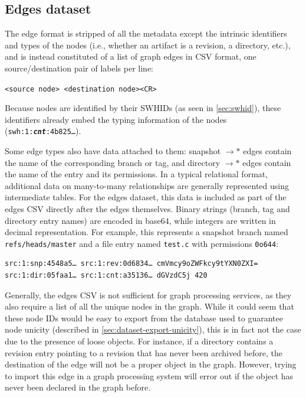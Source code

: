 \subsection{Edges dataset}
\label{sec:edges-format}
The edge format is stripped of all the metadata except the intrinsic
identifiers and types of the nodes (i.e., whether an artifact is a revision, a
directory, etc.), and is instead constituted of a list of graph edges in CSV
format, one source/destination pair of labels per line:

\texttt{<source node> <destination node><CR>}

Because nodes are identified by their \glspl{SWHID} (as seen in
\cref{sec:swhid}), these identifiers already embed the typing
information of the nodes (\texttt{swh:1:\emph{\textbf{cnt}}:4b825…}).

Some edge types also have data attached to them: snapshot $\rightarrow\ast$
edges contain the name of the corresponding branch or tag, and
directory $\rightarrow\ast$ edges contain the name of the entry and its
permissions.
In a typical relational format, additional data on many-to-many relationships
are generally represented using intermediate tables. For the edges dataset,
this data is included as part of the edges CSV directly after the edges
themselves. Binary strings (branch, tag and directory entry names) are encoded
in base64, while integers are written in decimal representation. For example,
this represents a snapshot branch named \texttt{refs/heads/master} and a file
entry named \texttt{test.c} with permissions \texttt{0o644}:

\begin{verbatim}
src:1:snp:4548a5… src:1:rev:0d6834… cmVmcy9oZWFkcy9tYXN0ZXI=
src:1:dir:05faa1… src:1:cnt:a35136… dGVzdC5j 420
\end{verbatim}

Generally, the edges CSV is not sufficient for graph processing services, as
they also require a list of all the unique nodes in the graph. While it could
seem that these node IDs would be easy to export from the database used to
guarantee node unicity (described in \cref{sec:dataset-export-unicity}),
this is in fact not the case due to the presence of loose objects. For
instance, if a directory contains a revision entry pointing to a revision that
has never been archived before, the destination of the edge will not be a
proper object in the graph. However, trying to import this edge in a graph
processing system will error out if the object has never been declared in the
graph before.

